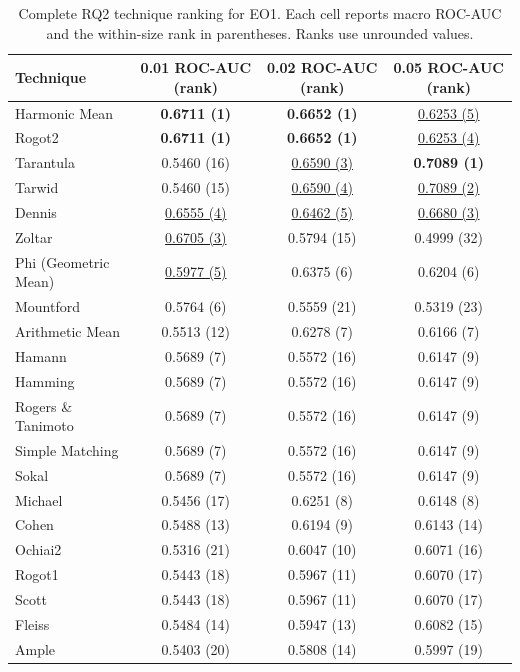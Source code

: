 \begin{table}[t]
\centering
\caption{Complete RQ2 technique ranking for EO1. Each cell reports macro ROC-AUC and the within-size rank in parentheses. Ranks use unrounded values.}
\label{tab:rq2-supplementary-eo1}
{\scriptsize
\setlength{\tabcolsep}{7pt}
\renewcommand{\arraystretch}{0.96}
\begin{tabular}{lccc}
\toprule
Technique & 0.01 ROC-AUC (rank) & 0.02 ROC-AUC (rank) & 0.05 ROC-AUC (rank) \\
\midrule
Harmonic Mean & \textbf{0.6711 (1)} & \textbf{0.6652 (1)} & \underline{0.6253 (5)} \\
Rogot2 & \textbf{0.6711 (1)} & \textbf{0.6652 (1)} & \underline{0.6253 (4)} \\
Tarantula & 0.5460 (16) & \underline{0.6590 (3)} & \textbf{0.7089 (1)} \\
Tarwid & 0.5460 (15) & \underline{0.6590 (4)} & \underline{0.7089 (2)} \\
Dennis & \underline{0.6555 (4)} & \underline{0.6462 (5)} & \underline{0.6680 (3)} \\
Zoltar & \underline{0.6705 (3)} & 0.5794 (15) & 0.4999 (32) \\
Phi (Geometric Mean) & \underline{0.5977 (5)} & 0.6375 (6) & 0.6204 (6) \\
Mountford & 0.5764 (6) & 0.5559 (21) & 0.5319 (23) \\
Arithmetic Mean & 0.5513 (12) & 0.6278 (7) & 0.6166 (7) \\
Hamann & 0.5689 (7) & 0.5572 (16) & 0.6147 (9) \\
Hamming & 0.5689 (7) & 0.5572 (16) & 0.6147 (9) \\
Rogers \& Tanimoto & 0.5689 (7) & 0.5572 (16) & 0.6147 (9) \\
Simple Matching & 0.5689 (7) & 0.5572 (16) & 0.6147 (9) \\
Sokal & 0.5689 (7) & 0.5572 (16) & 0.6147 (9) \\
Michael & 0.5456 (17) & 0.6251 (8) & 0.6148 (8) \\
Cohen & 0.5488 (13) & 0.6194 (9) & 0.6143 (14) \\
Ochiai2 & 0.5316 (21) & 0.6047 (10) & 0.6071 (16) \\
Rogot1 & 0.5443 (18) & 0.5967 (11) & 0.6070 (17) \\
Scott & 0.5443 (18) & 0.5967 (11) & 0.6070 (17) \\
Fleiss & 0.5484 (14) & 0.5947 (13) & 0.6082 (15) \\
Ample & 0.5403 (20) & 0.5808 (14) & 0.5997 (19) \\

\end{tabular}}
\end{table}
